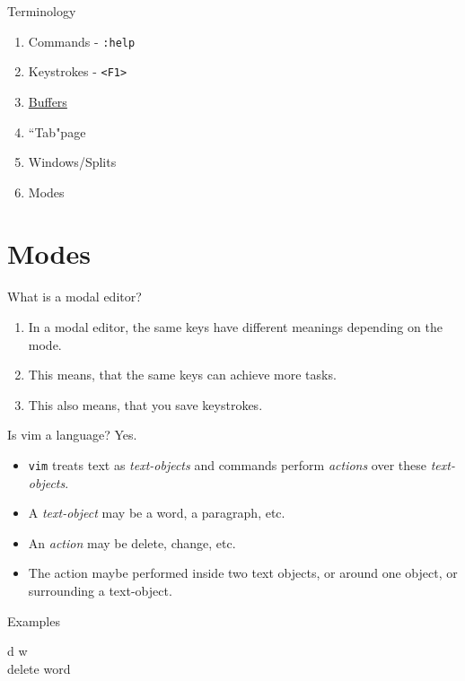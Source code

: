 \documentclass[11pt]{beamer}
\begin{document}
		\begin{frame}{Terminology}
			\begin{enumerate}
				\item Commands - \texttt{:help}
				\item Keystrokes - \texttt{<F1>}
				\item \hyperlink{https://vim.fandom.com/wiki/Vim_buffer_FAQ}{Buffers}
				\item ``Tab"page
				\item Windows/Splits
				\item Modes
			\end{enumerate}	
		\end{frame}

	\section{Modes}

		\begin{frame}{What is a modal editor?}
			\begin{enumerate}
				\item In a modal editor, the same keys have different meanings depending on the mode.
				\item This means, that the same keys can achieve more tasks.
				\item This also means, that you save keystrokes.
			\end{enumerate}
		\end{frame}

		\begin{frame}{Is vim a language? Yes.}
			\begin{itemize}
				\item \texttt{vim} treats text as \emph{text-objects} and commands perform \emph{actions} over these \emph{text-objects}.
				\item A \emph{text-object} may be a word, a paragraph, etc.
				\item An \emph{action} may be delete, change, etc.
				\item The action maybe performed inside two text objects, or around one object, or surrounding a text-object.
			\end{itemize}
			
			\begin{block}{Examples}
				\begin{center}
					\Huge d w \\
					\tiny delete \; word
				\end{center}
			\end{block}
		\end{frame}
\end{document}
